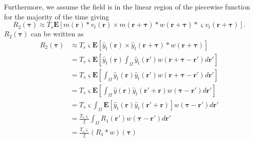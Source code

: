 \documentclass[]{article}
\begin{document}
Furthermore, we assume the field is in the linear region of the piecewise function for the majority of the time giving
\begin{equation}
	R_2(\boldsymbol{\tau}) \approx T_s\mathbf{E}\left[ m\left(\mathbf{r}\right) \ast v_t\left(\mathbf{r}\right) \times m\left(\mathbf{r}+\boldsymbol{\tau}\right) \ast w\left(\mathbf{r}+\boldsymbol{\tau}\right) \ast \varsigma v_t\left(\mathbf{r}+\boldsymbol{\tau}\right) \right].
\end{equation}
$R_2(\boldsymbol{\tau})$ can be written as
\begin{align}
	R_2(\boldsymbol{\tau}) &\approx	T_s \varsigma \mathbf{E}\left[ \hat{y}_t\left(\mathbf{r}\right) \times \hat{y}_t\left(\mathbf{r}+\boldsymbol{\tau}\right) \ast w\left(\mathbf{r}+\boldsymbol{\tau}\right)\right] \\
	&= T_s \varsigma \mathbf{E}\left[ \hat{y}_t\left(\mathbf{r}\right)  \int_{\Omega}\hat{y}_t\left(\mathbf{r'}\right) w\left(\mathbf{r}+\boldsymbol{\tau}-\mathbf{r'}\right) d\mathbf{r'} \right] \\
	&= T_s \varsigma \mathbf{E}\left[  \int_{\Omega}\hat{y}_t\left(\mathbf{r}\right)\hat{y}_t\left(\mathbf{r'}\right) w\left(\mathbf{r}+\boldsymbol{\tau}-\mathbf{r'}\right) d\mathbf{r'} \right] \\
	&= T_s \varsigma \mathbf{E}\left[  \int_{\Omega}\hat{y}\left(\mathbf{r}\right)\hat{y}_t\left(\mathbf{r'}+\mathbf{r}\right) w\left(\boldsymbol{\tau}-\mathbf{r'}\right) d\mathbf{r'} \right] \\
	&= T_s \varsigma   \int_{\Omega}\mathbf{E}\left[\hat{y}_t\left(\mathbf{r}\right)\hat{y}_t\left(\mathbf{r'}+\mathbf{r}\right) \right] w\left(\boldsymbol{\tau}-\mathbf{r}'\right) d\mathbf{r'} \nonumber \\
	&= \frac{T_s \varsigma}{\xi} \int_{\Omega} R_1(\mathbf{r'}) w\left(\boldsymbol{\tau}-\mathbf{r}'\right) d\mathbf{r'} \nonumber \\
	&= \frac{T_s \varsigma}{\xi} \left(R_1 \ast w\right)\left(\boldsymbol{\tau}\right)\\
\end{align}
\end{document}
